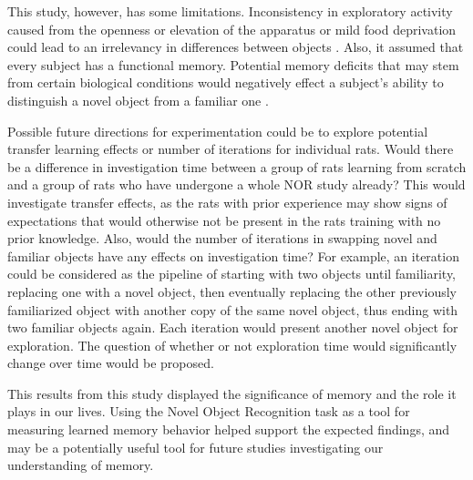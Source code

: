 \documentclass[a4paper, 12pt]{article}
\begin{document}
This study, however, has some limitations. Inconsistency in exploratory activity caused from the openness or elevation of the apparatus or mild food deprivation could lead to an irrelevancy in differences between objects \cite{antunes2012novel}. Also, it assumed that every subject has a functional memory. Potential memory deficits that may stem from certain biological conditions would negatively effect a subject's ability to distinguish a novel object from a familiar one \cite{bevins2006object}.

Possible future directions for experimentation could be to explore potential transfer learning effects or number of iterations for individual rats. Would there be a difference in investigation time between a group of rats learning from scratch and a group of rats who have undergone a whole NOR study already? This would investigate transfer effects, as the rats with prior experience may show signs of expectations that would otherwise not be present in the rats training with no prior knowledge. Also, would the number of iterations in swapping novel and familiar objects have any effects on investigation time? For example, an iteration could be considered as the pipeline of starting with two objects until familiarity, replacing one with a novel object, then eventually replacing the other previously familiarized object with another copy of the same novel object, thus ending with two familiar objects again. Each iteration would present another novel object for exploration. The question of whether or not exploration time would significantly change over time would be proposed.

This results from this study displayed the significance of memory and the role it plays in our lives. Using the Novel Object Recognition task as a tool for measuring learned memory behavior helped support the expected findings, and may be a potentially useful tool for future studies investigating our understanding of memory.



\end{document}
